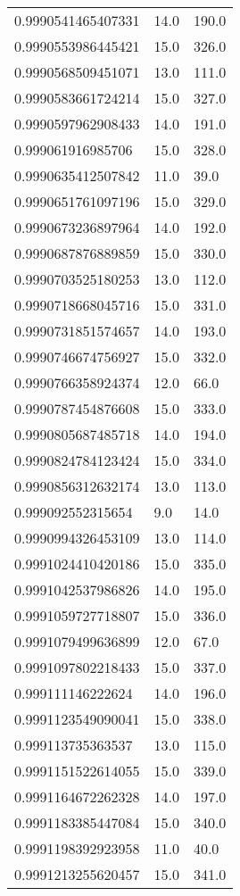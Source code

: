 \begin{center}
\begin{supertabular}[H]{p{0.30\textwidth}p{0.05\textwidth}p{0.05\textwidth}}
0.9990541465407331 & 14.0 & 190.0 \\ 
0.9990553986445421 & 15.0 & 326.0 \\ 
0.9990568509451071 & 13.0 & 111.0 \\ 
0.9990583661724214 & 15.0 & 327.0 \\ 
0.9990597962908433 & 14.0 & 191.0 \\ 
0.999061916985706 & 15.0 & 328.0 \\ 
0.9990635412507842 & 11.0 & 39.0 \\ 
0.9990651761097196 & 15.0 & 329.0 \\ 
0.9990673236897964 & 14.0 & 192.0 \\ 
0.9990687876889859 & 15.0 & 330.0 \\ 
0.9990703525180253 & 13.0 & 112.0 \\ 
0.9990718668045716 & 15.0 & 331.0 \\ 
0.9990731851574657 & 14.0 & 193.0 \\ 
0.9990746674756927 & 15.0 & 332.0 \\ 
0.9990766358924374 & 12.0 & 66.0 \\ 
0.9990787454876608 & 15.0 & 333.0 \\ 
0.9990805687485718 & 14.0 & 194.0 \\ 
0.9990824784123424 & 15.0 & 334.0 \\ 
0.9990856312632174 & 13.0 & 113.0 \\ 
0.999092552315654 & 9.0 & 14.0 \\ 
0.9990994326453109 & 13.0 & 114.0 \\ 
0.9991024410420186 & 15.0 & 335.0 \\ 
0.9991042537986826 & 14.0 & 195.0 \\ 
0.9991059727718807 & 15.0 & 336.0 \\ 
0.9991079499636899 & 12.0 & 67.0 \\ 
0.9991097802218433 & 15.0 & 337.0 \\ 
0.999111146222624 & 14.0 & 196.0 \\ 
0.9991123549090041 & 15.0 & 338.0 \\ 
0.999113735363537 & 13.0 & 115.0 \\ 
0.9991151522614055 & 15.0 & 339.0 \\ 
0.9991164672262328 & 14.0 & 197.0 \\ 
0.9991183385447084 & 15.0 & 340.0 \\ 
0.9991198392923958 & 11.0 & 40.0 \\ 
0.9991213255620457 & 15.0 & 341.0 \\ 

\end{supertabular}
\end{center}
